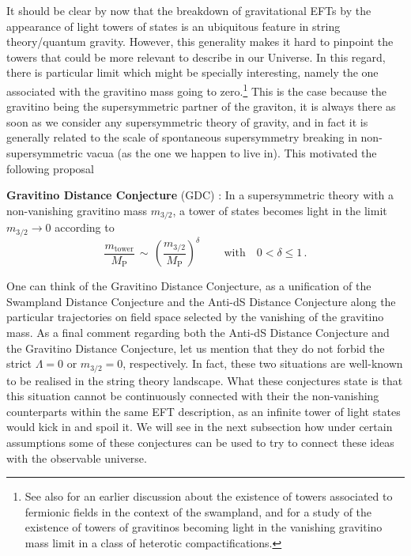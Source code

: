 \documentclass[11pt,a4paper]{article}
\def\mp{{M_{\text{P}}}}
\begin{document}
	
	It should be clear by now that the breakdown of  gravitational EFTs by the appearance of  light towers of states is an ubiquitous feature in string theory/quantum gravity. However, this generality makes it hard to pinpoint the towers that could be more relevant to describe in our Universe. In this regard, there is particular limit which might be specially interesting, namely the one associated with the gravitino mass going to zero.\footnote{See also \cite{Palti:2020tsy} for an earlier discussion about the existence of towers associated to fermionic fields in the context of the swampland, and \cite{Antoniadis:1988jn} for a study of the existence of towers of gravitinos becoming light in the vanishing gravitino mass limit in a class of heterotic compactifications.} This is the case because the gravitino being the supersymmetric partner of the graviton, it is always there as soon as we consider any supersymmetric theory of gravity, and in fact it is generally related to the scale of spontaneous supersymmetry breaking in non-supersymmetric vacua (as the one we happen to live in). This motivated the following proposal
	\vspace{0.2cm}
	\begin{tcolorbox}[colback=boxblue]
  	\textbf{Gravitino Distance Conjecture} (GDC) \cite{Cribiori:2021gbf, Castellano:2021yye}: In a supersymmetric  theory with a non-vanishing gravitino mass $m_{3/2}$, a tower of states becomes light in the limit $m_{3/2}\rightarrow 0$ according to
		\begin{equation}
		\label{eq:GDC}
		\dfrac{m_{\mathrm{tower}}}{\mp}\, \sim \, \left( \dfrac{m_{3/2}}{\mp}\right)^\delta\,   \qquad \text{with} \quad  0<\delta \leq 1  \, .
	\end{equation}
	 
\end{tcolorbox}	
	
	One can think of the Gravitino Distance Conjecture, as a unification of the Swampland Distance Conjecture and the Anti-dS Distance Conjecture along the particular trajectories on field space selected by the vanishing of the gravitino mass. As a final comment regarding both the Anti-dS Distance Conjecture and the Gravitino Distance Conjecture, let us mention that they do not forbid the strict $\Lambda=0$ or $m_{3/2}=0$, respectively. In fact, these two situations are well-known to be realised in the string theory landscape. What these conjectures state is that this situation cannot be continuously connected with their the non-vanishing counterparts within the same EFT description, as an infinite tower of light states would kick in and spoil it. We will see in the next subsection how under certain assumptions some of these conjectures can be used to try to connect these ideas with the observable universe.
\end{document}
